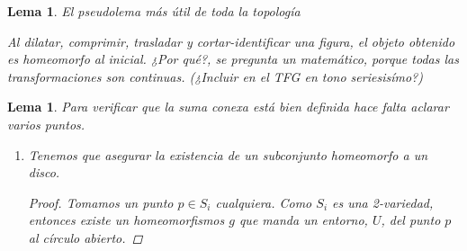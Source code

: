 \documentclass[a4paper,11pt,spanish, twoside, leqno]{tfg-uam}
\newtheorem{lema}[teor]{Lema}
\theoremstyle{definition}
\begin{document}
\begin{lema}{El pseudolema más útil de toda la topología}
	
	Al dilatar, comprimir, trasladar y cortar-identificar una figura, el objeto obtenido es homeomorfo al inicial. ¿Por qué?, se pregunta un matemático, porque todas las transformaciones son continuas. (¿Incluir en el TFG en tono seriesisímo?) 
\end{lema}
\begin{lema}\label{lema:sumaconexa}
	Para verificar que la suma conexa está bien definida hace falta aclarar varios puntos.
	\begin{enumerate}
		\item 
		Tenemos que asegurar la existencia de un subconjunto homeomorfo a un disco.
		\begin{proof}
			Tomamos un punto $p\in S_i$ cualquiera. Como $S_i$ es una 2-variedad, entonces existe un homeomorfismos $g$ que manda un entorno, $U$, del punto $p$ al círculo abierto. 
			

\end{proof}
\end{enumerate}
\end{lema}
\end{document}
